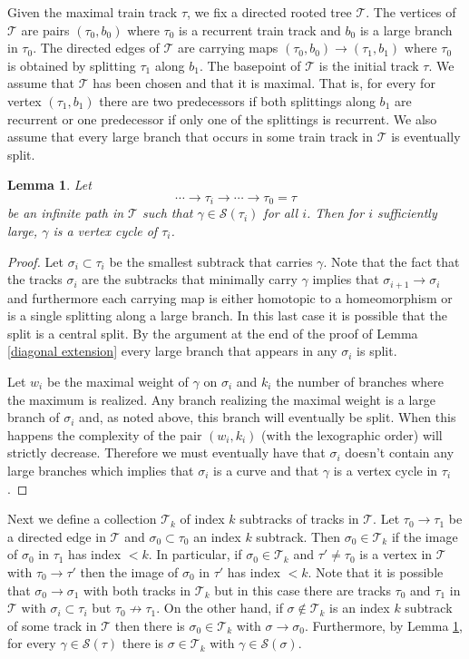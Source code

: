 \documentclass[11pt]{article}
\newtheorem{lemma}[thm]{Lemma}
\theoremstyle{remark}
\def\S{{\mathcal S}}
\def\T{{\mathcal T}}
\begin{document}
Given the maximal train track $\tau$, we fix a directed rooted tree $\T$. The vertices of $\T$ are pairs $(\tau_0, b_0)$ where $\tau_0$ is a recurrent train track and $b_0$ is a large branch in $\tau_0$. The directed edges of $\T$ are carrying maps $(\tau_0, b_0) \longrightarrow (\tau_1, b_1)$ where $\tau_0$ is obtained by splitting $\tau_1$ along $b_1$. 
The basepoint of $\T$ is the initial track $\tau$. We assume that $\T$ has been chosen and that it is maximal. That is, for every for vertex $(\tau_1, b_1)$ there are two predecessors if both splittings along $b_1$ are recurrent or one predecessor if only one of the splittings is recurrent. We also assume that every large branch that occurs in some train track in $\T$ is eventually split. 

\begin{lemma}\label{split to vertex cycle}
Let
$$ \cdots \to \tau_i \to \cdots \to \tau_0 = \tau$$
be an infinite path in $\T$ such that $\gamma \in \S(\tau_i)$ for all $i$. Then for $i$ sufficiently large, $\gamma$ is a vertex cycle of $\tau_i$.
\end{lemma}

\begin{proof}
Let $\sigma_i \subset \tau_i$ be the smallest subtrack that carries $\gamma$. Note that the fact that the tracks $\sigma_i$ are the subtracks that minimally carry $\gamma$ implies that $\sigma_{i+1}\to\sigma_i$ and furthermore each carrying map is either homotopic to a homeomorphism or is a single splitting along a large branch. In this last case it is possible that the split is a central split. By the argument at the end of the proof of Lemma \ref{diagonal extension} every large branch that appears in any $\sigma_i$ is split.

Let $w_i$ be the maximal weight of $\gamma$ on $\sigma_i$ and $k_i$ the number of branches where the maximum is realized. Any branch realizing the maximal weight is a large branch of $\sigma_i$ and, as noted above, this branch will eventually be split.  When this happens the complexity of the pair $(w_i, k_i)$ (with the lexographic order) will strictly decrease. Therefore we must eventually have that $\sigma_i$ doesn't contain any large branches which implies that $\sigma_i$ is a curve and that $\gamma$ is a vertex cycle in $\tau_i$.
\end{proof}

 Next we define a collection $\T_k$ of index $k$ subtracks of tracks in $\T$.  Let $\tau_0 \to \tau_1$ be a directed edge in $\T$ and $\sigma_0 \subset \tau_0$ an index $k$ subtrack. Then $\sigma_0 \in \T_k$ if the image of $\sigma_0$ in $\tau_1$ has index $< k$. In particular, if $\sigma_0 \in \T_k$ and $\tau' \neq \tau_0$ is a vertex in $\T$ with $\tau_0\to \tau'$ then the image of $\sigma_0$ in $\tau'$ has index $< k$. Note that it is possible that $\sigma_0 \to \sigma_1$ with both tracks in $\T_k$ but in this case there are tracks $\tau_0$ and $\tau_1$ in $\T$ with $\sigma_i \subset \tau_i$ but $\tau_0 \not\to\tau_1$. On the other hand, if $\sigma \not\in\T_k$ is an index $k$ subtrack of some track in $\T$ then there is $\sigma_0 \in \T_k$ with $\sigma \to \sigma_0$.
  Furthermore, by Lemma \ref{split to vertex cycle}, for every $\gamma \in \S(\tau)$ there is $\sigma \in \T_k$ with $\gamma \in \S(\sigma)$.
\end{document}
